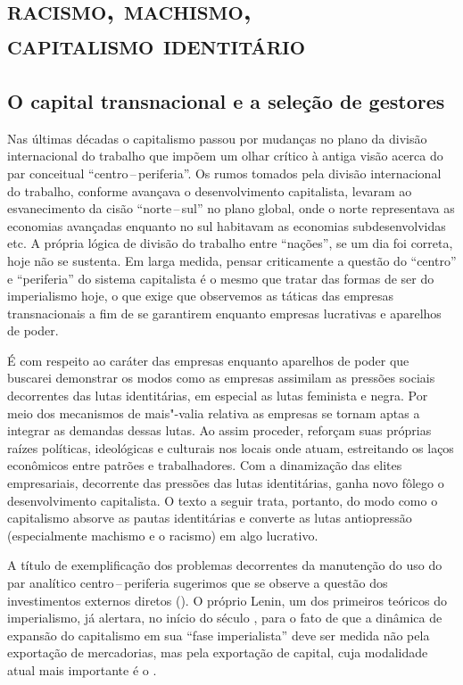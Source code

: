 \part[racismo, machismo, capitalismo identitário]{\textsc{racismo, machismo,\\ capitalismo identitário}}

\chapter{O capital transnacional e a seleção de gestores}

Nas últimas décadas o capitalismo passou por mudanças no plano da
divisão internacional do trabalho que impõem um olhar crítico à antiga
visão acerca do par conceitual ``centro\,--\,periferia''. Os rumos tomados
pela divisão internacional do trabalho, conforme avançava o
desenvolvimento capitalista, levaram ao esvanecimento da cisão ``norte\,--\,sul'' no plano global, onde o norte representava as economias
avançadas enquanto no sul habitavam as economias subdesenvolvidas etc. A
própria lógica de divisão do trabalho entre ``nações'', se um dia foi
correta, hoje não se sustenta. Em larga medida, pensar criticamente a
questão do ``centro'' e ``periferia'' do sistema capitalista é o mesmo
que tratar das formas de ser do imperialismo hoje, o que exige que
observemos as táticas das empresas transnacionais a fim de se garantirem
enquanto empresas lucrativas e aparelhos de poder.

É com respeito ao caráter das empresas enquanto aparelhos de poder que
buscarei demonstrar os modos como as empresas assimilam as pressões
sociais decorrentes das lutas identitárias, em especial as lutas
feminista e negra. Por meio dos mecanismos de mais"-valia relativa as
empresas se tornam aptas a integrar as demandas dessas lutas. Ao assim
proceder, reforçam suas próprias raízes políticas, ideológicas e
culturais nos locais onde atuam, estreitando os laços econômicos entre
patrões e trabalhadores. Com a dinamização das elites empresariais,
decorrente das pressões das lutas identitárias, ganha novo fôlego o
desenvolvimento capitalista. O texto a seguir trata, portanto, do modo
como o capitalismo absorve as pautas identitárias e converte as lutas
antiopressão (especialmente machismo e o racismo) em algo lucrativo.

A título de exemplificação dos problemas decorrentes da manutenção do
uso do par analítico centro\,--\,periferia sugerimos que se observe a questão
dos investimentos externos diretos (). O próprio Lenin, um dos
primeiros teóricos do imperialismo, já alertara, no início do século ,
para o fato de que a dinâmica de expansão do capitalismo em sua ``fase
imperialista'' deve ser medida não pela exportação de mercadorias, mas
pela exportação de capital, cuja modalidade atual mais importante é o
.

